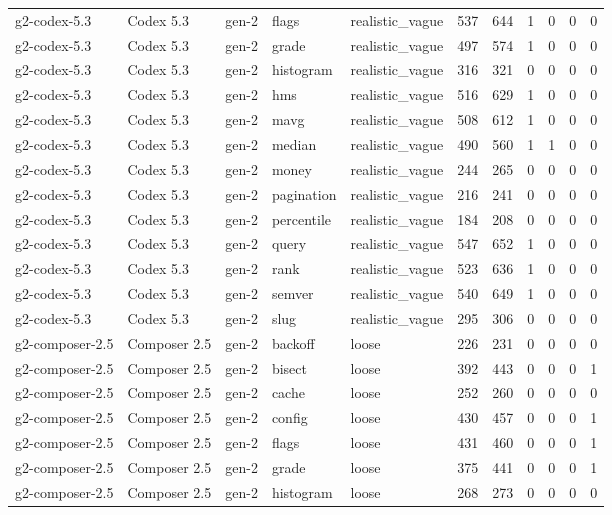 \begin{tabular}{lllllllllll}
g2-codex-5.3 & Codex 5.3 & gen-2 & flags & realistic\_vague & 537 & 644 & 1 & 0 & 0 & 0 \\
g2-codex-5.3 & Codex 5.3 & gen-2 & grade & realistic\_vague & 497 & 574 & 1 & 0 & 0 & 0 \\
g2-codex-5.3 & Codex 5.3 & gen-2 & histogram & realistic\_vague & 316 & 321 & 0 & 0 & 0 & 0 \\
g2-codex-5.3 & Codex 5.3 & gen-2 & hms & realistic\_vague & 516 & 629 & 1 & 0 & 0 & 0 \\
g2-codex-5.3 & Codex 5.3 & gen-2 & mavg & realistic\_vague & 508 & 612 & 1 & 0 & 0 & 0 \\
g2-codex-5.3 & Codex 5.3 & gen-2 & median & realistic\_vague & 490 & 560 & 1 & 1 & 0 & 0 \\
g2-codex-5.3 & Codex 5.3 & gen-2 & money & realistic\_vague & 244 & 265 & 0 & 0 & 0 & 0 \\
g2-codex-5.3 & Codex 5.3 & gen-2 & pagination & realistic\_vague & 216 & 241 & 0 & 0 & 0 & 0 \\
g2-codex-5.3 & Codex 5.3 & gen-2 & percentile & realistic\_vague & 184 & 208 & 0 & 0 & 0 & 0 \\
g2-codex-5.3 & Codex 5.3 & gen-2 & query & realistic\_vague & 547 & 652 & 1 & 0 & 0 & 0 \\
g2-codex-5.3 & Codex 5.3 & gen-2 & rank & realistic\_vague & 523 & 636 & 1 & 0 & 0 & 0 \\
g2-codex-5.3 & Codex 5.3 & gen-2 & semver & realistic\_vague & 540 & 649 & 1 & 0 & 0 & 0 \\
g2-codex-5.3 & Codex 5.3 & gen-2 & slug & realistic\_vague & 295 & 306 & 0 & 0 & 0 & 0 \\
g2-composer-2.5 & Composer 2.5 & gen-2 & backoff & loose & 226 & 231 & 0 & 0 & 0 & 0 \\
g2-composer-2.5 & Composer 2.5 & gen-2 & bisect & loose & 392 & 443 & 0 & 0 & 0 & 1 \\
g2-composer-2.5 & Composer 2.5 & gen-2 & cache & loose & 252 & 260 & 0 & 0 & 0 & 0 \\
g2-composer-2.5 & Composer 2.5 & gen-2 & config & loose & 430 & 457 & 0 & 0 & 0 & 1 \\
g2-composer-2.5 & Composer 2.5 & gen-2 & flags & loose & 431 & 460 & 0 & 0 & 0 & 1 \\
g2-composer-2.5 & Composer 2.5 & gen-2 & grade & loose & 375 & 441 & 0 & 0 & 0 & 1 \\
g2-composer-2.5 & Composer 2.5 & gen-2 & histogram & loose & 268 & 273 & 0 & 0 & 0 & 0 \\

\end{tabular}
